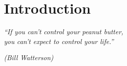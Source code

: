 \chapter{Introduction}
\epigraph{\em ``If you can't control your peanut butter,\\ you can't expect to
control your life.''}{\em(Bill Watterson)}
